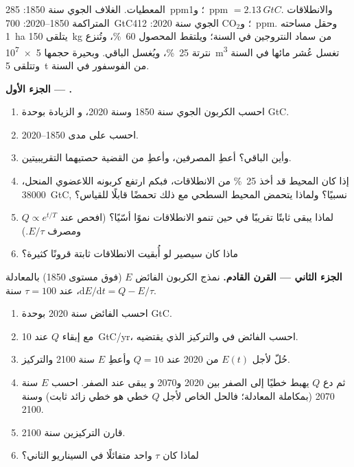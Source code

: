 \begin{problem}
\label{pb:b2:biogeochemical-cycles:1}
المعطيات. الغلاف الجوي سنة 1850: \qty{285}{ppm}؛ و\qty{1}{ppm} $=
\qty{2.13}{GtC}$. والانطلاقات المتراكمة 1850--2020: \qty{700}{GtC}؛
و$\mathrm{CO_2}$ الجوي سنة 2020: \qty{412}{ppm}. وحقل مساحته
\qty{1}{ha} يتلقى \qty{150}{kg} من سماد النتروجين في السنة؛
ويلتقط المحصول \qty{60}{\%}، وتُنزع نترتة \qty{25}{\%}، ويُغسل
الباقي. وبحيرة حجمها \qty{5e7}{m^3} تغسل عُشر مائها
في السنة وتتلقى \qty{5}{t} من الفوسفور في السنة.

\medskip
\noindent\textbf{الجزء الأول --- .}
\begin{enumerate}
  \item احسب الكربون الجوي سنة 1850 وسنة 2020، و
        الزيادة بوحدة \unit{GtC}.
  \item احسب  على مدى 1850--2020.
  \item وأين الباقي؟ أعطِ المصرفين، وأعطِ من
        القضية حصتيهما التقريبيتين.
  \item إذا كان المحيط قد أخذ \qty{25}{\%} من الانطلاقات، فبكم
        ارتفع كربونه اللاعضوي المنحل، \qty{38000}{GtC},
        نسبيًا؟ ولماذا يتحمض المحيط السطحي مع ذلك
        تحمضًا قابلًا للقياس؟
  \item لماذا يبقى  ثابتًا تقريبًا في حين
        تنمو الانطلاقات نموًا أسّيًا؟ (افحص  عند
        $Q \propto e^{t/T}$ ومصرف $E/\tau$.)
  \item ماذا كان سيصير  لو أُبقيت
        الانطلاقات ثابتة قرونًا كثيرة؟
\end{enumerate}

\medskip
\noindent\textbf{الجزء الثاني --- القرن القادم.}
نمذج الكربون الفائض $E$ (فوق مستوى 1850) بالمعادلة
$\mathrm{d}E/\mathrm{d}t = Q - E/\tau$، عند $\tau = 100$ سنة.
\begin{enumerate}[resume]
  \item احسب الفائض سنة 2020 بوحدة \unit{GtC}.
  \item مع إبقاء $Q$ عند \qty{10}{GtC/yr}، احسب الفائض في  والتركيز الذي يقتضيه.
  \item حُلّ لأجل $E(t)$ من 2020 عند $Q = 10$ وأعطِ $E$ سنة
        2100 والتركيز.
  \item ثم دع $Q$ يهبط خطيًا إلى الصفر بين 2020 و2070 و
        يبقى عند الصفر. احسب $E$ سنة 2070 (بمكاملة المعادلة؛
        فالحل الخاص لأجل $Q$ خطي هو خطي زائد
        ثابت) وسنة 2100.
  \item قارن التركيزين سنة 2100.
  \item لماذا كان $\tau$ واحد متفائلًا في السيناريو الثاني؟
\end{enumerate}


\end{problem}
